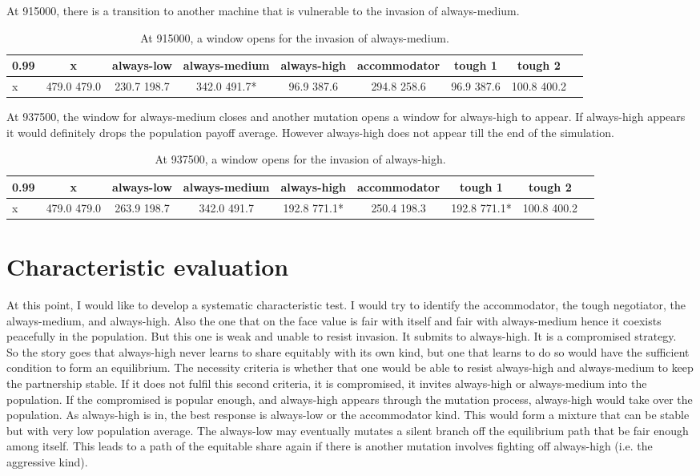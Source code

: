 \documentclass[12.5pt]{report}
\begin{document}
At 915000, there is a transition to another machine that is vulnerable to the invasion of always-medium.
\begin{table}[h!]
\center
\begin{tabular}{l|cccccccc}
\textbf{0.99}& x & always-low & always-medium & always-high & accommodator &tough 1 & tough 2\\
\hline
x& 479.0 479.0 & 230.7 198.7 & 342.0 491.7*  &96.9 387.6&  294.8 258.6&   96.9 387.6&  100.8 400.2\\ 
\end{tabular}
\caption{At 915000, a window opens for the invasion of always-medium.}
\end{table}
At 937500, the window for always-medium closes and another mutation opens a window for always-high to appear. If always-high appears it would definitely drops the population payoff average. However always-high does not appear till the end of the simulation.
\begin{table}[h!]
\center
\begin{tabular}{l|cccccccc}
\textbf{0.99}& x & always-low & always-medium & always-high & accommodator &tough 1 & tough 2\\
\hline
x& 479.0 479.0&  263.9 198.7&  342.0 491.7&  192.8 771.1*& 250.4 198.3 & 192.8 771.1*& 100.8 400.2 \\
\end{tabular}
\caption{At 937500, a window opens for the invasion of always-high.}
\end{table}

\section{Characteristic evaluation }

At this point, I would like to develop a systematic characteristic test. I would try to identify the accommodator, the tough negotiator, the always-medium, and always-high. Also the one that on the face value is fair with itself and fair with always-medium hence it coexists peacefully in the population. But this one is weak and unable to resist invasion. It submits to always-high. It is a compromised strategy.\\

So the story goes that always-high never learns to share equitably with its own kind, but one that learns to do so would have the sufficient condition to form an equilibrium. The necessity criteria is whether that one would be able to resist always-high and always-medium to keep the partnership stable. If it does not fulfil this second criteria, it is compromised, it invites always-high or always-medium into the population. If the compromised is popular enough, and always-high appears through the mutation process, always-high would take over the population. As always-high is in, the best response is always-low or the accommodator kind. This would form a mixture that can be stable but with very low population average. The always-low may eventually mutates a silent branch off the equilibrium path that be fair enough among itself. This leads to a path of the equitable share again if there is another mutation involves fighting off always-high (i.e. the aggressive kind).\\
\end{document}
